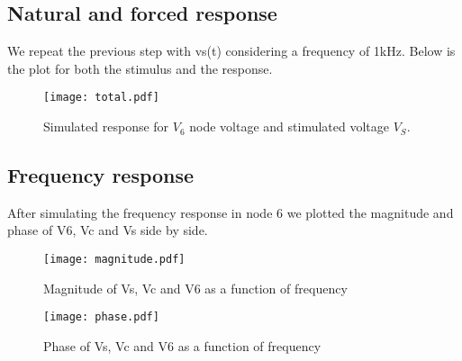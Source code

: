 \subsection{Natural and forced response}
We repeat the previous step with vs(t) considering a frequency of 1kHz. Below is the plot for both the stimulus and the response.
\begin{figure}[!h] \centering
\texttt{[image: total.pdf]}
\caption{Simulated response for $V_{6}$ node voltage and stimulated voltage $V_{S}$.}
\label{fig:total}
\end{figure}
\newpage
\subsection{Frequency response}
After simulating the frequency response in node 6 we plotted the magnitude and phase of V6, Vc and Vs side by side.
\begin{figure}[!h] \centering
\texttt{[image: magnitude.pdf]}
\caption{Magnitude of Vs, Vc and V6 as a function of frequency}
\label{fig:magnitude}
\end{figure}
\begin{figure}[h] \centering
\texttt{[image: phase.pdf]}
\caption{Phase of Vs, Vc and V6 as a function of frequency}
\label{fig:phase}
\end{figure}
\par
